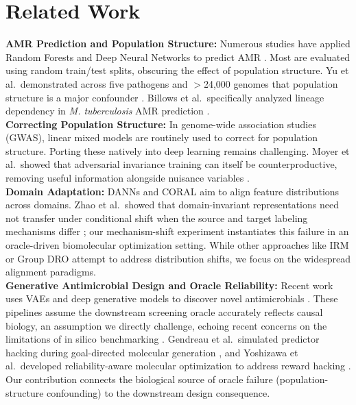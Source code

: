 \documentclass{article}
\begin{document}
\section{Related Work}
\textbf{AMR Prediction and Population Structure:} Numerous studies have applied Random Forests and Deep Neural Networks to predict AMR \cite{moradigaravand2018prediction}. Most are evaluated using random train/test splits, obscuring the effect of population structure. Yu et al.\ demonstrated across five pathogens and $>$24,000 genomes that population structure is a major confounder \cite{yu2025population}. Billows et al.\ specifically analyzed lineage dependency in \textit{M. tuberculosis} AMR prediction \cite{billows2023mtb}. \\
\textbf{Correcting Population Structure:} In genome-wide association studies (GWAS), linear mixed models \cite{earle2016identifying, lees2018pyseer} are routinely used to correct for population structure. Porting these natively into deep learning remains challenging. Moyer et al.\ showed that adversarial invariance training can itself be counterproductive, removing useful information alongside nuisance variables \cite{moyer2018invariant}. \\
\textbf{Domain Adaptation:} DANNs \cite{ganin2016domain} and CORAL \cite{sun2016deep} aim to align feature distributions across domains. Zhao et al.\ showed that domain-invariant representations need not transfer under conditional shift when the source and target labeling mechanisms differ \cite{zhao2019learning}; our mechanism-shift experiment instantiates this failure in an oracle-driven biomolecular optimization setting. While other approaches like IRM \cite{arjovsky2019invariant} or Group DRO \cite{sagawa2019distributionally} attempt to address distribution shifts, we focus on the widespread alignment paradigms. \\
\textbf{Generative Antimicrobial Design and Oracle Reliability:} Recent work uses VAEs and deep generative models to discover novel antimicrobials \cite{das2021accelerated, szymczak2023hydramp}. These pipelines assume the downstream screening oracle accurately reflects causal biology, an assumption we directly challenge, echoing recent concerns on the limitations of in silico benchmarking \cite{anon2025overconfident}. Gendreau et al.\ simulated predictor hacking during goal-directed molecular generation \cite{gendreau2023assays}, and Yoshizawa et al.\ developed reliability-aware molecular optimization to address reward hacking \cite{yoshizawa2025dyramo}. Our contribution connects the biological source of oracle failure (population-structure confounding) to the downstream design consequence.
\end{document}
